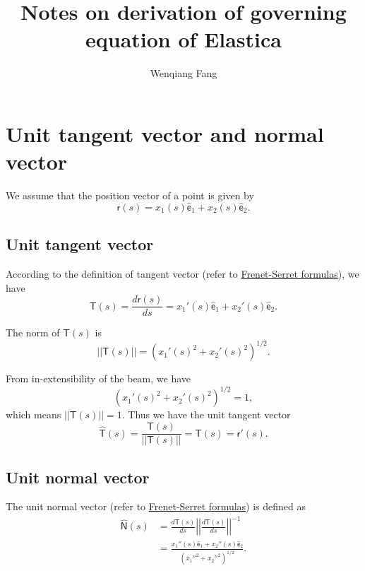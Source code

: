 \documentclass{article}
\author{Wenqiang Fang}
\title{Notes on derivation of governing equation of Elastica}
\date{}
\newcommand{\bsf}[1]{\boldsymbol{\mathsf{#1}}}
\begin{document}
\maketitle

\section{Unit tangent vector and normal vector}

We assume that the position vector of a point is given by
\begin{equation}
\bsf{r}(s) = x_1(s) \hat{\bsf{e}}_1 + x_2(s) \hat{\bsf{e}}_2.	
\end{equation}	

\subsection{Unit tangent vector}
According to the definition of tangent vector (refer to \href{https://en.wikipedia.org/wiki/Frenet-Serret\_formulas}{Frenet-Serret formulas}), we have 
\begin{equation}
\label{eq:rprime}
\bsf{T}(s) = \frac{d \bsf{r}(s)}{d s} = x_1'(s) \hat{\bsf{e}}_1 + x_2'(s) \hat{\bsf{e}}_2.
\end{equation}

The norm of $\bsf{T}(s)$ is 
\begin{equation}
||\bsf{T}(s)|| = \left( x_1'(s)^2  + x_2'(s)^2  \right)^{1/2}.
\end{equation}

From in-extensibility of the beam, we have
\begin{equation}
\label{eq:in-extensibility}
 \left( x_1'(s)^2  + x_2'(s)^2  \right)^{1/2} = 1,
\end{equation}
which means $||\bsf{T}(s)||  = 1$. Thus we have the unit tangent vector
\begin{equation}
\label{eq:TUnit}
 \hat{\bsf{T}}(s) = \frac {\bsf{T}(s)} {||\bsf{T}(s)||} = \bsf{T}(s) = \bsf{r}'(s).
\end{equation}

\subsection{Unit normal vector}

The unit normal vector (refer to \href{https://en.wikipedia.org/wiki/Frenet-Serret\_formulas}{Frenet-Serret formulas}) is defined as
\begin{align}
\hat{\bsf{N}}(s) & =  \frac{d \bsf{T}(s)}{d s} \left|\left|\frac{d \bsf{T}(s)}{d s}\right|\right|^{-1}  \\
& =  \frac{x_1''(s) \hat{\bsf{e}}_1 + x_2''(s) \hat{\bsf{e}}_2}{(x_1''^2+ x_2''^2)^{1/2}} .
\end{align}
\end{document}
